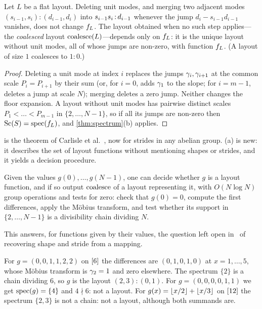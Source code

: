 \begin{corollary}\label{cor:coalesce}
Let $L$ be a flat layout. Deleting unit modes, and merging two adjacent modes
$(s_{i-1},s_i):(d_{i-1},d_i)$ into $s_{i-1}s_i\,{:}\,d_{i-1}$ whenever the jump
$d_i-s_{i-1}d_{i-1}$ vanishes, does not change $f_{L}$. The layout obtained when no such step
applies---the \emph{coalesced} layout $\operatorname{coalesce}(L)$---depends only on $f_{L}$: it is the unique
layout without unit modes, all of whose jumps are non-zero, with function $f_{L}$.
{\rm(}A layout of size $1$ coalesces to $1:0$.{\rm)}
\end{corollary}
\begin{proof}
Deleting a unit mode at index $i$ replaces the jumps $\gamma_i,\gamma_{i+1}$ at the common scale
$P_i=P_{i+1}$ by their sum (or, for $i=0$, adds $\gamma_1$ to the slope; for $i=m-1$, deletes a
jump at scale $N$); merging deletes a zero jump. Neither changes the floor expansion. A layout
without unit modes has pairwise distinct scales $P_1<\dots<P_{m-1}$ in $\{2,\dots,N-1\}$, so if
all its jumps are non-zero then $\operatorname{Sc}(S)=\operatorname{spec}(f_{L})$, and \cref{thm:spectrum}(b) applies.
\end{proof}

 is the theorem of Carlisle et al.\ \cite[Prop.~2.1.4.18--19]{carlisle2026},
now for strides in any abelian group. (a) is new: it describes the set of
layout functions without mentioning shapes or strides, and it yields a decision procedure.

\begin{corollary}[recognition]\label{cor:recognition}
Given the values $g(0),\dots,g(N-1)$, one can decide whether $g$ is a layout function, and if so
output $\operatorname{coalesce}$ of a layout representing it, with $O(N\log N)$ group operations and tests for
zero: check that $g(0)=0$, compute the first differences, apply the M\"obius transform, and test
whether its support in $\{2,\dots,N-1\}$ is a divisibility chain dividing $N$.
\end{corollary}

\noindent This answers, for functions given by their values, the question left open
in~\cite[\S3.7]{bhaskaracharya2025} of recovering shape and stride from a mapping.

\begin{example}
For $g=(0,0,1,1,2,2)$ on $[6]$ the differences are $(0,1,0,1,0)$ at $x=1,\dots,5$, whose
M\"obius transform is $\gamma_2=1$ and zero elsewhere. The spectrum $\{2\}$ is a chain dividing $6$,
so $g$ is the layout $(2,3):(0,1)$. For $g=(0,0,0,0,1,1)$ we get $\operatorname{spec}(g)=\{4\}$ and $4\nmid6$: not
a layout. For $g(x)=\left\lfloor x/2 \right\rfloor+\left\lfloor x/3 \right\rfloor$ on $[12]$ the spectrum $\{2,3\}$ is not a chain:
not a layout, although both summands are.
\end{example}

